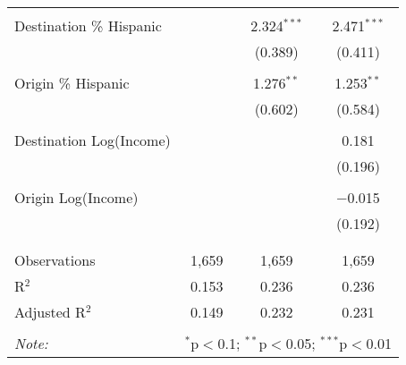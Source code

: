 \begin{table}[!htbp]
\begin{tabular}{@{\extracolsep{5pt}}lccc}
  & & & \\ 
 Destination \% Hispanic &  & 2.324$^{***}$ & 2.471$^{***}$ \\ 
  &  & (0.389) & (0.411) \\ 
  & & & \\ 
 Origin \% Hispanic &  & 1.276$^{**}$ & 1.253$^{**}$ \\ 
  &  & (0.602) & (0.584) \\ 
  & & & \\ 
 Destination Log(Income) &  &  & 0.181 \\ 
  &  &  & (0.196) \\ 
  & & & \\ 
 Origin Log(Income) &  &  & $-$0.015 \\ 
  &  &  & (0.192) \\ 
  & & & \\ 
\hline \\[-1.8ex] 
Observations & 1,659 & 1,659 & 1,659 \\ 
R$^{2}$ & 0.153 & 0.236 & 0.236 \\ 
Adjusted R$^{2}$ & 0.149 & 0.232 & 0.231 \\ 
\hline 
\hline \\[-1.8ex] 
\textit{Note:}  & \multicolumn{3}{r}{$^{*}$p$<$0.1; $^{**}$p$<$0.05; $^{***}$p$<$0.01} \\ 
\end{tabular} 
\end{table} 
